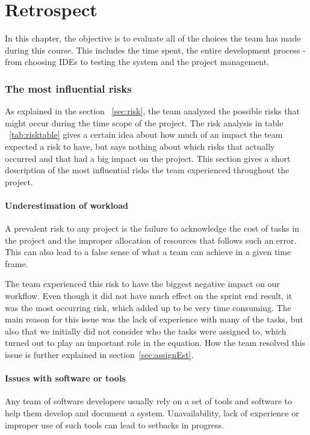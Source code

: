 \chapter{Retrospect}
In this chapter, the objective is to evaluate all of the choices the team has made during this course. This includes the time spent, the entire development process - from choosing IDEs to testing the system and the project management. 





\subsection{The most influential risks}
As explained in the section ~\ref{sec:risk}, the team analyzed the possible risks that might occur during the time scope of the project. The risk analysis in table ~\ref{tab:risktable} gives a certain idea about how much of an impact the team expected a risk to have, but says nothing about which risks that actually occurred and that had a big impact on the project. This section gives a short description of the most influential risks the team experienced throughout the project.

\subsubsection{Underestimation of workload}
A prevalent risk to any project is the failure to acknowledge the cost of tasks in the project and the improper allocation of resources that follows such an error. This can also lead to a false sense of what a team can achieve in a given time frame. 

The team experienced this risk to have the biggest negative impact on our workflow. Even though it did not have much effect on the sprint end result, it was the most occurring risk, which added up to be very time consuming. The main reason for this issue was the lack of experience with many of the tasks, but also that we initially did not consider who the tasks were assigned to, which turned out to play an important role in the equation. How the team resolved this issue is further explained in section~\ref{sec:assignEst}.

\subsubsection{Issues with software or tools}
Any team of software developers usually rely on a set of tools and software to help them develop and document a system. Unavailability, lack of experience or improper use of such tools can lead to setbacks in progress.

